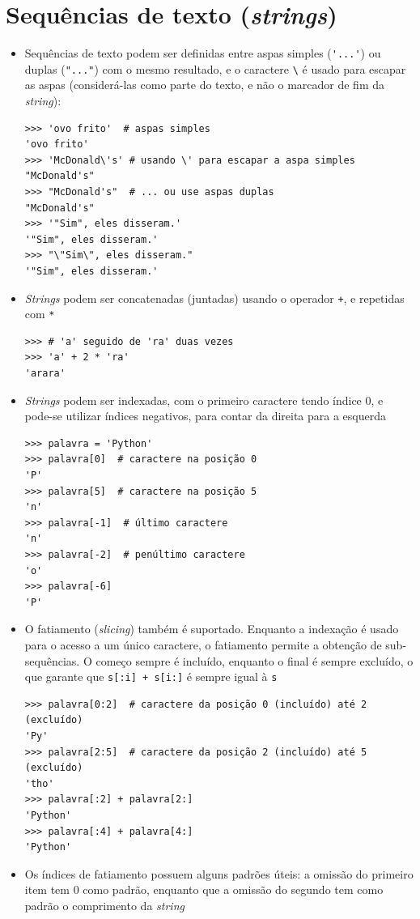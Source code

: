 \section{Sequências de texto (\textit{strings})}
\begin{itemize}
	\item Sequências de texto podem ser definidas entre aspas simples (\verb|'...'|) ou duplas (\verb|"..."|) com o mesmo resultado, e o caractere \verb|\| é usado para escapar as aspas (considerá-las como parte do texto, e não o marcador de fim da \textit{string}):
	\begin{verbatim}
>>> 'ovo frito'  # aspas simples
'ovo frito'
>>> 'McDonald\'s' # usando \' para escapar a aspa simples
"McDonald's"
>>> "McDonald's"  # ... ou use aspas duplas
"McDonald's"
>>> '"Sim", eles disseram.'
'"Sim", eles disseram.'
>>> "\"Sim\", eles disseram."
'"Sim", eles disseram.'
	\end{verbatim}
	\item \textit{Strings} podem ser concatenadas (juntadas) usando o operador \verb|+|, e repetidas com \verb|*|
	\begin{verbatim}
>>> # 'a' seguido de 'ra' duas vezes
>>> 'a' + 2 * 'ra'
'arara'
	\end{verbatim}
	\item \textit{Strings} podem ser indexadas, com o primeiro caractere tendo índice 0, e pode-se utilizar índices negativos, para contar da direita para a esquerda
	\begin{verbatim}
>>> palavra = 'Python'
>>> palavra[0]  # caractere na posição 0
'P'
>>> palavra[5]  # caractere na posição 5
'n'
>>> palavra[-1]  # último caractere
'n'
>>> palavra[-2]  # penúltimo caractere
'o'
>>> palavra[-6]
'P'
	\end{verbatim}
	\item O fatiamento (\textit{slicing}) também é suportado. Enquanto a indexação é usado para o acesso a um único caractere, o fatiamento permite a obtenção de sub-sequências. O começo sempre é incluído, enquanto o final é sempre excluído, o que garante que \verb|s[:i] + s[i:]| é sempre igual à \verb|s|
	\begin{verbatim}
>>> palavra[0:2]  # caractere da posição 0 (incluído) até 2 (excluído)
'Py'
>>> palavra[2:5]  # caractere da posição 2 (incluído) até 5 (excluído)
'tho'
>>> palavra[:2] + palavra[2:]
'Python'
>>> palavra[:4] + palavra[4:]
'Python'
	\end{verbatim}
	\item Os índices de fatiamento possuem alguns padrões úteis: a omissão do primeiro item tem 0 como padrão, enquanto que a omissão do segundo tem como padrão o comprimento da \textit{string}

\end{itemize}
